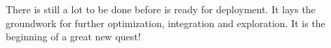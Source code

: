 There is still a lot to be done before \magnethical{} is ready for deployment. It lays the groundwork for further optimization, integration and exploration. It is the beginning of a great new quest!

